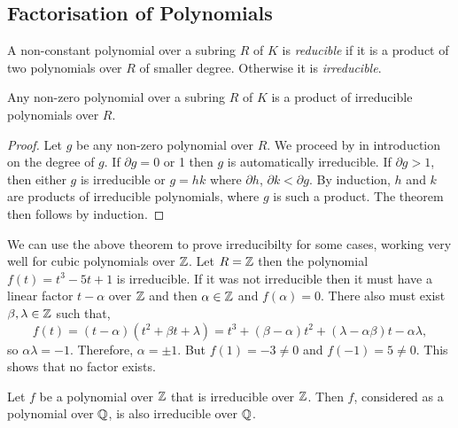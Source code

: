 \subsection{Factorisation of Polynomials}
\begin{definition}
     A non-constant polynomial over a subring $R$ of $K$ is \textit{reducible} if it is a product of two polynomials over $R$ of smaller degree. Otherwise it is \textit{irreducible}.
\end{definition}

\begin{theorem}
    Any non-zero polynomial over a subring $R$ of $K$ is a product of irreducible polynomials over $R$.
\end{theorem}

\begin{proof}
    Let $g$ be any non-zero polynomial over $R$. We proceed by in introduction on the degree of $g$. If $\partial g = 0$ or 1 then $g$ is automatically irreducible. If $\partial g > 1$, then either $g$ is irreducible or $g = hk$ where $\partial h$, $\partial k < \partial g$. By induction, $h$ and $k$ are products of irreducible polynomials, where $g$ is such a product. The theorem then follows by induction.
\end{proof}

\begin{example}
    We can use the above theorem to prove irreducibilty for some cases, working very well for cubic polynomials over $\mathbb Z$. Let $R = \mathbb Z$ then the polynomial $f(t) = t^3 -5 t + 1$ is irreducible. If it was not irreducible then it must have a linear factor $t - \alpha$ over $\mathbb Z$ and then $\alpha \in \mathbb Z$ and $f(\alpha) = 0$. There also must exist $\beta, \lambda \in \mathbb Z$ such that,
    $$
    f(t) = (t-\alpha)(t^2 + \beta t + \lambda) = t^3 + (\beta - \alpha)t^2 + (\lambda - \alpha \beta)t - \alpha \lambda,
    $$
    so $\alpha \lambda = -1$. Therefore, $\alpha = \pm 1$. But $f(1) = -3 \neq 0$ and $f(-1) = 5 \neq 0$. This shows that no factor exists.
\end{example}

\begin{lemma}
     Let $f$ be a polynomial over $\mathbb Z$ that is irreducible over $\mathbb Z$. Then $f$, considered as a polynomial over $\mathbb Q$, is also irreducible over $\mathbb Q$.
\end{lemma}

